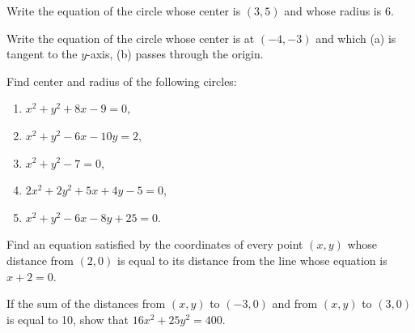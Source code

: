 \documentclass[11pt]{book}
\theoremstyle{bkplain}
\begin{document}
\begin{exercisecols}
\begin{exlist}
\item Write the equation of the circle whose center is $(3, 5)$ and whose
  radius is 6.
\item Write the equation of the circle whose center is at $(-4, -3)$ and which
  (a) is tangent to the $y$-axis, (b) passes through the origin.
\item Find center and radius of the following circles:
  \begin{enumerate}[label=(\alph*),leftmargin=1.5em,itemsep=0pt,topsep=2pt,
    parsep=0pt]
  \item $x^2 + y^2 + 8x - 9 = 0$,
  \item $x^2 + y^2 - 6x - 10y = 2$,
  \item $x^2 + y^2 - 7 = 0$,
  \item $2x^2 + 2y^2 + 5x + 4y - 5 = 0$,
  \item $x^2 + y^2 - 6x - 8y + 25 = 0$.
  \end{enumerate}
\item[\stex 4.] Find an equation satisfied by the coordinates of every point
  $(x, y)$ whose distance from $(2, 0)$ is equal to its distance from the line
  whose equation is $x + 2 = 0$.
\item[\stex 5.] If the sum of the distances from $(x, y)$ to $(-3, 0)$ and
  from $(x, y)$ to $(3, 0)$ is equal to 10, show that
  $16x^2 + 25y^2 = 400$.
\end{exlist}
\end{exercisecols}
\end{document}
